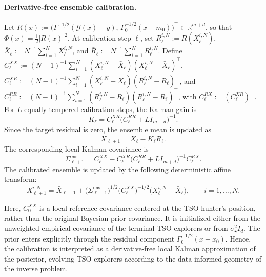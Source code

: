 \documentclass{article}
\numberwithin{equation}{section}
\begin{document}
\paragraph{Derivative-free ensemble calibration.}
Let
$R(x):=\bigl(\Gamma^{-1/2}(\mathcal{G}(x)-y),\,
\Gamma_0^{-1/2}(x-m_0)\bigr)^{\top}\in\mathbb{R}^{m+d}$,
so that $\Phi(x)=\frac{1}{2}| R(x)|^2$. At calibration step
$\ell$, set $R_\ell^{i,N}:=R(X_\ell^{i,N})$,
$\bar{X}_\ell:=N^{-1}\sum_{i=1}^N X_\ell^{i,N}$, and
$\bar{R}_\ell:=N^{-1}\sum_{i=1}^N R_\ell^{i,N}$. Define
$C_\ell^{XX}:=(N-1)^{-1}\sum_{i=1}^N
(X_\ell^{i,N}-\bar{X}_\ell)
(X_\ell^{i,N}-\bar{X}_\ell)^\top$, $C_\ell^{XR}:=(N-1)^{-1}\sum_{i=1}^N(X_\ell^{i,N}-\bar{X}_\ell)(R_\ell^{i,N}-\bar{R}_\ell)^\top$, and $C_\ell^{RR}:=(N-1)^{-1}\sum_{i=1}^N
(R_\ell^{i,N}-\bar{R}_\ell)(R_\ell^{i,N}-\bar{R}_\ell)^\top$, with $C_\ell^{RX}:=(C_\ell^{XR})^\top$. For $L$ equally tempered calibration steps, the Kalman gain is
\begin{equation}
    K_\ell =
    C_\ell^{XR}
    \bigl(C_\ell^{RR}+L I_{m+d}\bigr)^{-1}.
    \label{tsoeqn_kalman_gain}
\end{equation}
Since the target residual is zero, the ensemble mean is updated as
\begin{equation}
    \bar{X}_{\ell+1} =  \bar{X}_\ell-K_\ell\bar{R}_\ell.
    \label{eq:augmented_kalman_mean}
\end{equation}
The corresponding local Kalman covariance is
\begin{equation}
    \Sigma_{\ell+1}^{\mathrm{ens}}
    = C_\ell^{XX} -  C_\ell^{XR}\big(C_\ell^{RR}+L I_{m+d}\big)^{-1}C_\ell^{RX}.
    \label{tsoeqn_kalman_covariance}
\end{equation}
The calibrated ensemble is updated by the following deterministic affine transform:
\begin{equation}
    X_{\ell+1}^{i,N}
    =
    \bar{X}_{\ell+1}
    +
    \bigl(\Sigma_{\ell+1}^{\mathrm{ens}}\bigr)^{1/2}
    \bigl(C_\ell^{XX}\bigr)^{-1/2}
    \bigl(X_\ell^{i,N}-\bar{X}_\ell\bigr),
    \qquad i=1,\ldots,N.
    \label{tsoeq:kalman_ensemble}
\end{equation}

Here, $C_0^{XX}$ is a local reference covariance centered at the TSO hunter's position, rather than the original Bayesian prior covariance.
It is initialized either from the unweighted empirical covariance of the terminal
TSO explorers or from $\sigma_\star^2 I_d$. The prior enters explicitly
through the residual component $\Gamma_0^{-1/2}(x-x_0)$. Hence, the
calibration is interpreted as a derivative-free local Kalman
approximation of the posterior, evolving TSO explorers according to the data informed geometry of the inverse problem.
\end{document}
